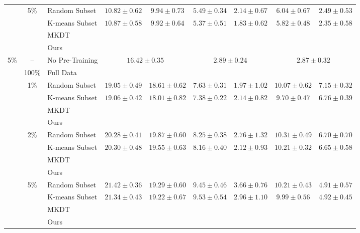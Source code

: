 \begin{table}[t]
{\begin{tabular}{@{}cclcccccc@{}}
& \multirow{4}{*}{5\%} & Random Subset
& $10.82 \pm 0.62$ & $9.94 \pm 0.73$
& $5.49 \pm 0.34$ & $2.14 \pm 0.67$
& $6.04 \pm 0.67$ & $2.49 \pm 0.53$ \\
& & K-means Subset
& $10.87 \pm 0.58$ & $9.92 \pm 0.64$
& $5.37 \pm 0.51$ & $1.83 \pm 0.62$
& $5.82 \pm 0.48$ & $2.35 \pm 0.58$ \\
& & MKDT & & & & & & \\
& & Ours
& &
& &
&  &  \\

\midrule

\multirow{14}{*}{5\%}
& -- & No Pre-Training
& \multicolumn{2}{c}{$16.42 \pm 0.35$}
& \multicolumn{2}{c}{$2.89 \pm 0.24$}
& \multicolumn{2}{c}{$2.87 \pm 0.32$} \\
\cmidrule(lr){2-9}

& 100\% & Full Data
&  & 
&  & 
&  &  \\
\cmidrule(lr){2-9}

& \multirow{4}{*}{1\%} & Random Subset
& $19.05 \pm 0.49$ & $18.61 \pm 0.62$
& $7.63 \pm 0.31$ & $1.97 \pm 1.02$
& $10.07 \pm 0.62$ & $7.15 \pm 0.32$ \\
& & K-means Subset
& $19.06 \pm 0.42$ & $18.01 \pm 0.82$
& $7.38 \pm 0.22$ & $2.14 \pm 0.82$
& $9.70 \pm 0.47$ & $6.76 \pm 0.39$ \\
& & MKDT & & & & & & \\
& & Ours
& &
& &
& & \\
\cmidrule(lr){2-9}

& \multirow{4}{*}{2\%} & Random Subset
& $20.28 \pm 0.41$ & $19.87 \pm 0.60$
& $8.25 \pm 0.38$ & $2.76 \pm 1.32$
& $10.31 \pm 0.49$ & $6.70 \pm 0.70$ \\
& & K-means Subset
& $20.30 \pm 0.48$ & $19.55 \pm 0.63$
& $8.16 \pm 0.40$ & $2.12 \pm 0.93$
& $10.21 \pm 0.32$ & $6.65 \pm 0.58$ \\
& & MKDT & & & & & & \\
& & Ours
& &
& &
&  &  \\
\cmidrule(lr){2-9}

& \multirow{4}{*}{5\%} & Random Subset
& $21.42 \pm 0.36$ & $19.29 \pm 0.60$
& $9.45 \pm 0.46$ & $3.66 \pm 0.76$
& $10.21 \pm 0.43$ & $4.91 \pm 0.57$ \\
& & K-means Subset
& $21.34 \pm 0.43$ & $19.22 \pm 0.67$
& $9.53 \pm 0.54$ & $2.96 \pm 1.10$
& $9.99 \pm 0.56$ & $4.92 \pm 0.45$ \\
& & MKDT & & & & & & \\
& & Ours
&  & 
& &
&  &  \\

\bottomrule
\end{tabular}%
}
\end{table}




